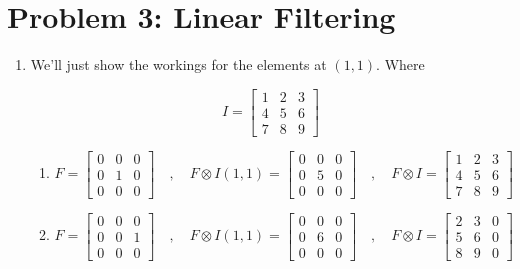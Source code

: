\documentclass{article}
\begin{document}
\section*{Problem 3: Linear Filtering}
\begin{enumerate}[label=(\roman*)]
\item %
We'll just show the workings for the elements at $(1,1)$. Where

\begin{equation}
I = \begin{bmatrix}
1 & 2 & 3 \\
4 & 5 & 6 \\
7 & 8 & 9
\end{bmatrix}
\end{equation}

\begin{enumerate}
	\item
	
	\begin{equation}
	F =
	\begin{bmatrix}
	0 & 0 & 0 \\
	0 & 1 & 0 \\
	0 & 0 & 0
	\end{bmatrix}
	\quad , \quad
	F \otimes I(1,1) =
	\begin{bmatrix}
	0 & 0 & 0 \\
	0 & 5 & 0 \\
	0 & 0 & 0
	\end{bmatrix}
	\quad , \quad
	F \otimes I = \begin{bmatrix}
	1 & 2 & 3 \\
	4 & 5 & 6 \\
	7 & 8 & 9
	\end{bmatrix}
	\end{equation}
	
	\item
	\begin{equation}
	F =
	\begin{bmatrix}
	0 & 0 & 0 \\
	0 & 0 & 1 \\
	0 & 0 & 0
	\end{bmatrix}
	\quad , \quad
	F \otimes I(1,1) =
	\begin{bmatrix}
	0 & 0 & 0 \\
	0 & 6 & 0 \\
	0 & 0 & 0
	\end{bmatrix}
	\quad , \quad
	F \otimes I = \begin{bmatrix}
	2 & 3 & 0 \\
	5 & 6 & 0 \\
	8 & 9 & 0
	\end{bmatrix}
	\end{equation}
	

\end{enumerate}
\end{enumerate}
\end{document}
